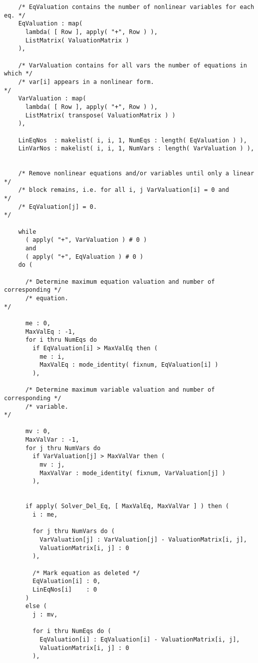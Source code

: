 \begin{verbatim}
    /* EqValuation contains the number of nonlinear variables for each eq. */
    EqValuation : map(
      lambda( [ Row ], apply( "+", Row ) ),
      ListMatrix( ValuationMatrix )
    ),

    /* VarValuation contains for all vars the number of equations in which */
    /* var[i] appears in a nonlinear form.                                 */
    VarValuation : map(
      lambda( [ Row ], apply( "+", Row ) ),
      ListMatrix( transpose( ValuationMatrix ) )
    ),

    LinEqNos  : makelist( i, i, 1, NumEqs : length( EqValuation ) ),
    LinVarNos : makelist( i, i, 1, NumVars : length( VarValuation ) ),


    /* Remove nonlinear equations and/or variables until only a linear    */
    /* block remains, i.e. for all i, j VarValuation[i] = 0 and           */
    /* EqValuation[j] = 0.                                                */

    while
      ( apply( "+", VarValuation ) # 0 )
      and
      ( apply( "+", EqValuation ) # 0 )
    do (

      /* Determine maximum equation valuation and number of corresponding */
      /* equation.                                                        */

      me : 0,
      MaxValEq : -1,
      for i thru NumEqs do
        if EqValuation[i] > MaxValEq then (
          me : i,
          MaxValEq : mode_identity( fixnum, EqValuation[i] )
        ),

      /* Determine maximum variable valuation and number of corresponding */
      /* variable.                                                        */

      mv : 0,
      MaxValVar : -1,
      for j thru NumVars do
        if VarValuation[j] > MaxValVar then (
          mv : j,
          MaxValVar : mode_identity( fixnum, VarValuation[j] )
        ),


      if apply( Solver_Del_Eq, [ MaxValEq, MaxValVar ] ) then (
        i : me,

        for j thru NumVars do (
          VarValuation[j] : VarValuation[j] - ValuationMatrix[i, j],
          ValuationMatrix[i, j] : 0
        ),

        /* Mark equation as deleted */
        EqValuation[i] : 0,
        LinEqNos[i]    : 0
      )
      else (
        j : mv,

        for i thru NumEqs do (
          EqValuation[i] : EqValuation[i] - ValuationMatrix[i, j],
          ValuationMatrix[i, j] : 0
        ),


\end{verbatim}
